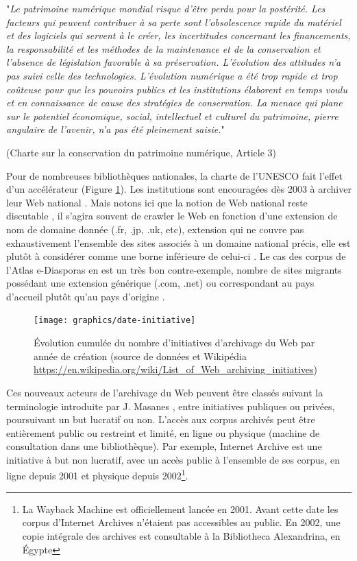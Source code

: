 \documentclass[symmetric,justified,marginals=raggedouter]{tufte-book}
\begin{document}
\begin{fullwidth}
"\textit{Le  patrimoine  numérique  mondial  risque  d'être  perdu  pour  la  postérité.  Les  facteurs  qui  peuvent  contribuer  à  sa  perte  sont  l'obsolescence  rapide  du  matériel  et  des  logiciels  qui  servent  à  le  créer,  les  incertitudes  concernant  les  financements,  la  responsabilité  et  les  méthodes  de  la  maintenance  et  de  la  conservation et l'absence de législation favorable à sa préservation. L'évolution des attitudes n'a pas suivi celle des technologies. L'évolution numérique a été trop rapide et trop coûteuse pour que les pouvoirs publics et les institutions élaborent en temps voulu et en connaissance de cause des stratégies de conservation. La menace qui plane sur le potentiel économique, social, intellectuel et culturel du patrimoine, pierre angulaire de l'avenir, n'a pas été pleinement saisie.}" 

\noindent(Charte sur la conservation du patrimoine numérique, Article 3)\\
\end{fullwidth}

\noindent Pour de nombreuses bibliothèques nationales, la charte de l'UNESCO fait l'effet d'un accélérateur (Figure \ref{fig:date-initiative}). Les institutions sont encouragées dès 2003 à archiver leur Web national \citep{gomes_survey_2011}. Mais notons ici que la notion de Web national reste discutable \citep{abiteboul_first_2002}, il s'agira souvent de crawler le Web en fonction d'une extension de nom de domaine donnée (.fr, .jp, .uk, etc), extension qui ne couvre pas exhaustivement l'ensemble des sites associés à un domaine national précis, elle est plutôt à considérer comme une borne inférieure de celui-ci \citep{koehler_analysis_1999}. Le cas des corpus de l'Atlas e-Diasporas en est un très bon contre-exemple, nombre de sites migrants possédant une extension générique (.com, .net) ou correspondant au pays d'accueil plutôt qu'au pays d'origine \citep{leclerc_cyberespace_2012}.  

\begin{figure}%
  \texttt{[image: graphics/date-initiative]}
  \caption{Évolution cumulée du nombre d'initiatives d'archivage du Web par année de création (source de données \citep{gomes_survey_2011} et Wikipédia \url{https://en.wikipedia.org/wiki/List_of_Web_archiving_initiatives})}
  \label{fig:date-initiative}
\end{figure} 

\noindent Ces nouveaux acteurs de l'archivage du Web peuvent être classés suivant la terminologie introduite par J. Masanes \citep{masanes_web_2006}, entre initiatives publiques ou privées, poursuivant un but lucratif ou non. L'accès aux corpus archivés peut être entièrement public ou restreint et limité, en ligne ou physique (machine de consultation dans une bibliothèque). Par exemple, Internet Archive est une initiative à but non lucratif, avec un accès public à l'ensemble de ses corpus, en ligne depuis 2001 et physique depuis 2002\footnote{La Wayback Machine est officiellement lancée en 2001. Avant cette date les corpus d'Internet Archives n'étaient pas accessibles au public. En 2002, une copie intégrale des archives est consultable à la Bibliotheca Alexandrina, en Égypte}. 
\end{document}
